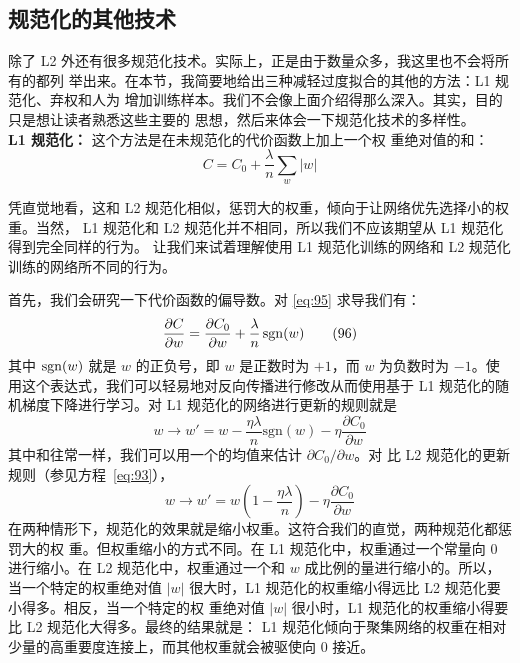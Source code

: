 \subsection{规范化的其他技术}

除了 L2 外还有很多规范化技术。实际上，正是由于数量众多，我这里也不会将所有的都列
举出来。在本节，我简要地给出三种减轻过度拟合的其他的方法：L1 规范化、弃权和人为
增加训练样本。我们不会像上面介绍得那么深入。其实，目的只是想让读者熟悉这些主要的
思想，然后来体会一下规范化技术的多样性。\\

\textbf{L1 规范化：} 这个方法是在未规范化的代价函数上加上一个权
重绝对值的和：
\begin{equation}
  C = C_0 + \frac{\lambda}{n} \sum_w |w|
  \label{eq:95}\tag{95}
\end{equation}

凭直觉地看，这和 L2 规范化相似，惩罚大的权重，倾向于让网络优先选择小的权重。当然，
L1 规范化和 L2 规范化并不相同，所以我们不应该期望从 L1 规范化得到完全同样的行为。
让我们来试着理解使用 L1 规范化训练的网络和 L2 规范化训练的网络所不同的行为。

首先，我们会研究一下代价函数的偏导数。对 \eqref{eq:95} 求导我们有：
\begin{equation}
  \frac{\partial C}{\partial w} = \frac{\partial C_0}{\partial w}
  + \frac{\lambda}{n} \, {\rm sgn}(w)
  \label{eq:96}\tag{96}
\end{equation}
其中 ${\rm sgn}(w)$ 就是 $w$ 的正负号，即 $w$ 是正数时为 $+1$，而 $w$ 为负数时为
$-1$。使用这个表达式，我们可以轻易地对反向传播进行修改从而使用基于 L1 规范化的随
机梯度下降进行学习。对 L1 规范化的网络进行更新的规则就是
\begin{equation}
  w \rightarrow w' = w-\frac{\eta \lambda}{n} \mbox{sgn}(w) - \eta \frac{\partial
  C_0}{\partial w}
  \label{eq:97}\tag{97}
\end{equation}
其中和往常一样，我们可以用一个\minibatch{}的均值来估计 $\partial C_0/\partial w$。对
比 L2 规范化的更新规则（参见方程~\eqref{eq:93}），
\begin{equation}
  w \rightarrow w' = w\left(1 - \frac{\eta \lambda}{n} \right)
  - \eta \frac{\partial C_0}{\partial w}
  \label{eq:98}\tag{98}
\end{equation}
在两种情形下，规范化的效果就是缩小权重。这符合我们的直觉，两种规范化都惩罚大的权
重。但权重缩小的方式不同。在 L1 规范化中，权重通过一个常量向 $0$ 进行缩小。在 L2
规范化中，权重通过一个和 $w$ 成比例的量进行缩小的。所以，当一个特定的权重绝对值
$|w|$ 很大时，L1 规范化的权重缩小得远比 L2 规范化要小得多。相反，当一个特定的权
重绝对值 $|w|$ 很小时，L1 规范化的权重缩小得要比 L2 规范化大得多。最终的结果就是：
L1 规范化倾向于聚集网络的权重在相对少量的高重要度连接上，而其他权重就会被驱使向
$0$ 接近。

